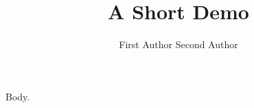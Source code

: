 \documentclass[article]{jss}
\title{A Short Demo}
\author{First Author \And Second Author}
\begin{document}
Body.
\end{document}
